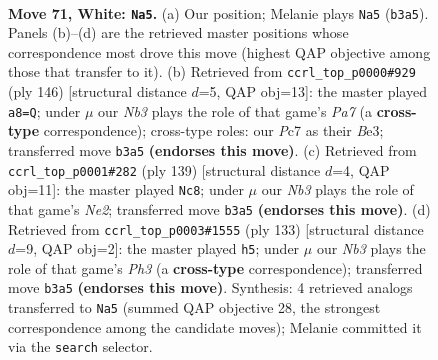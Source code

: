 \documentclass[11pt]{article}
\begin{document}
\clearpage

\begin{figure}[p]\centering
\begin{subfigure}{0.46\textwidth}\centering
\resizebox{\linewidth}{!}{%
\newchessgame
\chessboard[
  setfen={6k1/2P5/2r5/4B3/8/1N6/4K3/8 w - - 55 71},
  showmover=false,
  pgfstyle=straightmove, color=movearrow, markmove={b3-a5}
]}
\caption{}
\end{subfigure}\hfill
\begin{subfigure}{0.46\textwidth}\centering
\resizebox{\linewidth}{!}{%
\newchessgame
\chessboard[
  setfen={8/P7/8/1k6/8/r3B3/8/1K6 w - - 7 74},
  showmover=false,
  pgfstyle=straightmove, color=movearrow, markmove={a7-a8}
]}
\caption{}
\end{subfigure}
\\[4pt]
\begin{subfigure}{0.46\textwidth}\centering
\resizebox{\linewidth}{!}{%
\newchessgame
\chessboard[
  setfen={8/4n2k/1R6/3b4/8/1p6/5K2/8 b - - 13 70},
  showmover=false,
  pgfstyle=straightmove, color=movearrow, markmove={e7-c8}
]}
\caption{}
\end{subfigure}\hfill
\begin{subfigure}{0.46\textwidth}\centering
\resizebox{\linewidth}{!}{%
\newchessgame
\chessboard[
  setfen={6R1/8/5k1p/1b1K4/2p5/2P5/8/8 b - - 2 67},
  showmover=false,
  pgfstyle=straightmove, color=movearrow, markmove={h6-h5}
]}
\caption{}
\end{subfigure}
\caption{\textbf{Move 71, White: \texttt{Na5}.} (a) Our position; Melanie plays \texttt{Na5} (\texttt{b3a5}). Panels (b)--(d) are the retrieved master positions whose correspondence most drove this move (highest QAP objective among those that transfer to it). (b) Retrieved from \texttt{ccrl\_top\_p0000\#929} (ply 146) [structural distance $d$=5, QAP obj=13]: the master played \texttt{a8=Q}; under $\mu$ our \emph{Nb3} plays the role of that game's \emph{Pa7} (a \textbf{cross-type} correspondence); cross-type roles: our \emph{P}c7 as their \emph{B}e3; transferred move \texttt{b3a5} \textbf{(endorses this move)}. (c) Retrieved from \texttt{ccrl\_top\_p0001\#282} (ply 139) [structural distance $d$=4, QAP obj=11]: the master played \texttt{Nc8}; under $\mu$ our \emph{Nb3} plays the role of that game's \emph{Ne2}; transferred move \texttt{b3a5} \textbf{(endorses this move)}. (d) Retrieved from \texttt{ccrl\_top\_p0003\#1555} (ply 133) [structural distance $d$=9, QAP obj=2]: the master played \texttt{h5}; under $\mu$ our \emph{Nb3} plays the role of that game's \emph{Ph3} (a \textbf{cross-type} correspondence); transferred move \texttt{b3a5} \textbf{(endorses this move)}. Synthesis: 4 retrieved analogs transferred to \texttt{Na5} (summed QAP objective 28, the strongest correspondence among the candidate moves); Melanie committed it via the \texttt{search} selector.}
\label{fig:thought-m140}
\end{figure}
\end{document}

